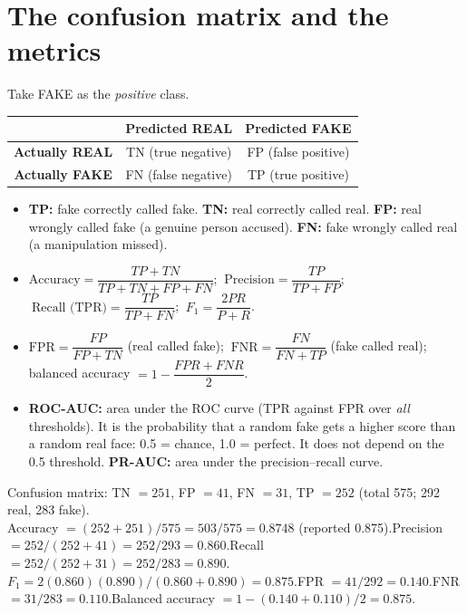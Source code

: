 \documentclass[11pt,a4paper]{report}
\begin{document}
\section{The confusion matrix and the metrics}
Take FAKE as the \emph{positive} class.
\begin{center}
\begin{tabular}{|c|c|c|}
\hline
 & \textbf{Predicted REAL} & \textbf{Predicted FAKE}\\\hline
\textbf{Actually REAL} & TN (true negative) & FP (false positive)\\\hline
\textbf{Actually FAKE} & FN (false negative) & TP (true positive)\\\hline
\end{tabular}
\end{center}
\begin{itemize}
\item \textbf{TP:} fake correctly called fake. \textbf{TN:} real correctly called real. \textbf{FP:} real wrongly called fake (a genuine person accused). \textbf{FN:} fake wrongly called real (a manipulation missed).
\item $\text{Accuracy}=\dfrac{TP+TN}{TP+TN+FP+FN}$; $\ \text{Precision}=\dfrac{TP}{TP+FP}$; $\ \text{Recall (TPR)}=\dfrac{TP}{TP+FN}$; $\ F_1=\dfrac{2PR}{P+R}$.
\item $\text{FPR}=\dfrac{FP}{FP+TN}$ (real called fake); $\ \text{FNR}=\dfrac{FN}{FN+TP}$ (fake called real); balanced accuracy $=1-\dfrac{FPR+FNR}{2}$.
\item \textbf{ROC-AUC:} area under the ROC curve (TPR against FPR over \emph{all} thresholds). It is the probability that a random fake gets a higher score than a random real face: 0.5 = chance, 1.0 = perfect. It does not depend on the 0.5 threshold. \textbf{PR-AUC:} area under the precision--recall curve.
\end{itemize}

\begin{keybox}
Confusion matrix: TN $=251$, FP $=41$, FN $=31$, TP $=252$ (total 575; 292 real, 283 fake).\\[2pt]
Accuracy $=(252+251)/575=503/575=0.8748$ (reported 0.875).\quad Precision $=252/(252+41)=252/293=0.860$.\quad Recall $=252/(252+31)=252/283=0.890$.\\
$F_1=2(0.860)(0.890)/(0.860+0.890)=0.875$.\quad FPR $=41/292=0.140$.\quad FNR $=31/283=0.110$.\quad Balanced accuracy $=1-(0.140+0.110)/2=0.875$.
\end{keybox}
\end{document}
